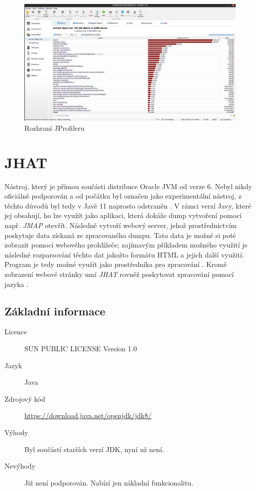 \begin{figure}[ht!]
	\centering
	\includegraphics[scale=0.3]{obrazky/jprofiler.png}
	\caption{Rozhraní JProfileru}
	\label{obr-jprofiler}
\end{figure}

\section{JHAT}
Nástroj, který je přímou součásti distribuce Oracle JVM od verze 6. Nebyl nikdy oficiálně podporován a od počátku byl označen jako experimentální nástroj, z těchto důvodů byl tedy v Javě 11 naprosto odstraněn \cite{jep241}\cite{java11migration}. V rámci verzí Javy, které jej obsahují, ho lze využít jako  aplikaci, která dokáže dump vytvoření pomocí např. \textit{JMAP} otevřít. Následně vytvoří webový server, jehož prostřednictvím poskytuje data získaná ze zpracovaného dumpu. Tato data je možné si poté zobrazit pomocí webového prohlížeče; zajímavým příkladem možného využití je následné rozparsování těchto dat jakožto formátu HTML a jejich další využití. Program je tedy možné využít jako prostředníka pro zpracování \cite{jhat}. Kromě  zobrazení webové stránky umí \textit{JHAT} rovněž poskytovat zpracování pomocí jazyka .

\subsection{Základní informace}

\begin{description}
    \item[Licence] SUN PUBLIC LICENSE Version 1.0
    \item[Jazyk] Java
    \item[Zdrojový kód] \url{https://download.java.net/openjdk/jdk8/}
    \item[Výhody] Byl součástí starších verzí JDK, nyní už není.
    \item[Nevýhody] Již není podporován. Nabízí jen základní funkcionalitu.
\end{description}


